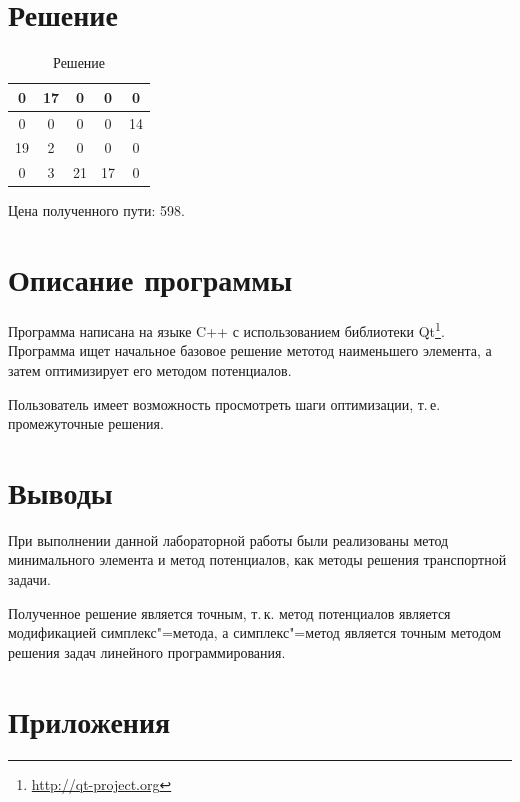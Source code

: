 \documentclass[a4paper,12pt,notitlepage,headsepline,pdftex]{scrartcl}
\begin{document}
  \newpage
\section{Решение}
  \begin{table}[h]
    \centering
    \begin{tabular}{|c|c|c|c|c|}
      \hline
      0 & 17 & 0 & 0 & 0\\
      \hline
      0 & 0 & 0 & 0 & 14\\
      \hline
      19 & 2 & 0 & 0 & 0\\
      \hline
      0 & 3 & 21 & 17 & 0\\
      \hline
    \end{tabular}
    \caption{Решение}
    \label{tab:answer}
  \end{table}

  Цена полученного пути: 598.
\section{Описание программы}
  Программа написана на языке C++ с использованием библиотеки
  Qt\footnote{\url{http://qt-project.org}}.
  Программа ищет начальное базовое решение метотод наименьшего элемента, а
  затем оптимизирует его методом потенциалов.

  Пользователь имеет возможность просмотреть шаги оптимизации, т.\,е.
  промежуточные решения.
  \newpage
\section{Выводы}
  При выполнении данной лабораторной работы были реализованы метод
  минимального элемента и метод потенциалов, как методы решения транспортной
  задачи.

  Полученное решение является точным, т.\,к. метод потенциалов является
  модификацией симплекс"=метода, а симплекс"=метод является точным методом
  решения задач линейного программирования.
  \newpage
\section{Приложения}
\end{document}
